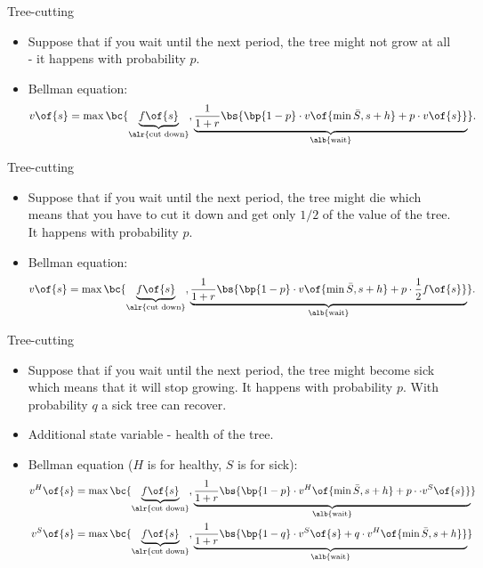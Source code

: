 \documentclass[11pt,xcolor={dvipsnames},aspectratio=159,hyperref={pdftex,pdfpagemode=UseNone,hidelinks,pdfdisplaydoctitle=true},usepdftitle=false]{beamer}
\begin{document}
\begin{frame}{Tree-cutting}   
    \begin{itemize}
    \item Suppose that if you wait until the next period, the tree might not grow at all - it happens with probability $p$.
    \item Bellman equation: \begin{align*}
        v\of{s} = \max\bc{\underbrace{f\of{s}}_{\alr{\text{cut down}}}, \underbrace{\frac{1}{1+r} \bs{\bp{1-p} \cdot v\of{\min{\bar{S},s+h}} + p \cdot v\of{s}}}_{\alb{\text{wait}}}}.
    \end{align*}
    \end{itemize}
\end{frame}

\begin{frame}{Tree-cutting}   
    \begin{itemize}
        \item Suppose that if you wait until the next period, the tree might die which means that you have to cut it down and get only $1/2$ of the value of the tree. It happens with probability $p$.
    \item Bellman equation: \begin{align*}
        v\of{s} = \max\bc{\underbrace{f\of{s}}_{\alr{\text{cut down}}}, \underbrace{\frac{1}{1+r} \bs{\bp{1-p} \cdot v\of{\min{\bar{S},s+h}} + p \cdot \frac{1}{2} f\of{s}}}_{\alb{\text{wait}}}}.
    \end{align*}
    \end{itemize}
\end{frame}

\begin{frame}{Tree-cutting}   
    \begin{itemize}
        \item Suppose that if you wait until the next period, the tree might become sick which means that it will stop growing. It happens with probability $p$. With probability $q$ a sick tree can recover. 
        \item Additional state variable - health of the tree. 
        \item Bellman equation ($H$ is for healthy, $S$ is for sick): \begin{align*}
        v^H\of{s} &= \max\bc{\underbrace{f\of{s}}_{\alr{\text{cut down}}}, \underbrace{\frac{1}{1+r} \bs{\bp{1-p} \cdot v^H\of{\min{\bar{S},s+h}} + p \cdot \cdot v^S\of{s}}}_{\alb{\text{wait}}}} \\
        v^S\of{s} &= \max\bc{\underbrace{f\of{s}}_{\alr{\text{cut down}}}, \underbrace{\frac{1}{1+r} \bs{\bp{1-q} \cdot v^S\of{s} + q \cdot v^H\of{\min{\bar{S},s+h}}}}_{\alb{\text{wait}}}} 
    \end{align*}
    \end{itemize}
\end{frame}
\end{document}
